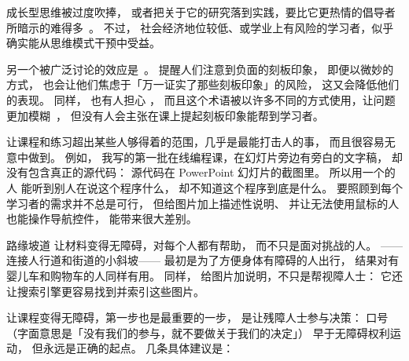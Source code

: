成长型思维被过度吹捧，
或者把关于它的研究落到实践，要比它更热情的倡导者所暗示的难得多~\cite{Sisk2018}。
不过，
社会经济地位较低、或学业上有风险的学习者，似乎确实能从思维模式干预中受益。

另一个被广泛讨论的效应是~\cite{Stee2011}。
提醒人们注意到负面的刻板印象，
即便以微妙的方式，
也会让他们焦虑于「万一证实了那些刻板印象」的风险，
这又会降低他们的表现。
同样，
也有人担心
，
而且这个术语被以许多不同的方式使用，让问题更加模糊~\cite{Shap2007}，
但没有人会主张在课上提起刻板印象能帮到学习者。


让课程和练习超出某些人够得着的范围，几乎是最能打击人的事，
而且很容易无意中做到。
例如，
我写的第一批在线编程课，在幻灯片旁边有旁白的文字稿，
却没有包含真正的源代码：
源代码在 PowerPoint 幻灯片的截图里。
所以用一个的人
能听到别人在说这个程序什么，
却不知道这个程序到底是什么。
要照顾到每个学习者的需求并不总是可行，
但给图片加上描述性说明、
并让无法使用鼠标的人也能操作导航控件，
能带来很大差别。

\begin{aside}{路缘坡道}
  让材料变得无障碍，对每个人都有帮助，
  而不只是面对挑战的人。
  ——连接人行道和街道的小斜坡——
  最初是为了方便身体有障碍的人出行，
  结果对有婴儿车和购物车的人同样有用。
  同样，
  给图片加说明，不只是帮视障人士：
  它还让搜索引擎更容易找到并索引这些图片。
\end{aside}

让课程变得无障碍，第一步也是最重要的一步，
是让残障人士参与决策：
口号\emph{}
（字面意思是「没有我们的参与，就不要做关于我们的决定」）
早于无障碍权利运动，
但永远是正确的起点。
几条具体建议是：

